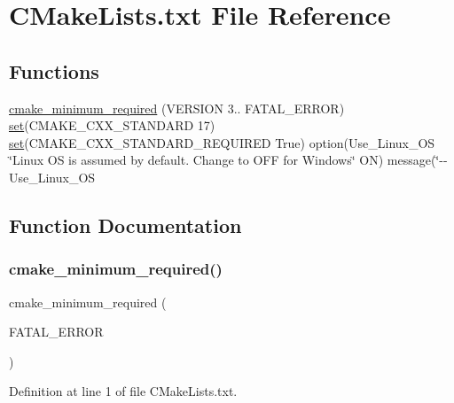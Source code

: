 \hypertarget{CMakeLists_8txt}{}\section{C\+Make\+Lists.\+txt File Reference}
\label{CMakeLists_8txt}
\subsection*{Functions}
\begin{DoxyCompactItemize}
\item 
\hyperlink{CMakeLists_8txt_a9ee6bb2c9e9a9eaaa86d8ae860fe2978}{cmake\+\_\+minimum\+\_\+required} (V\+E\+R\+S\+I\+ON 3.. F\+A\+T\+A\+L\+\_\+\+E\+R\+R\+OR) \hyperlink{3rd__party_2OCC__dependency_2CMakeLists_8txt_a074553c33956a239810d7affac62c071}{set}(C\+M\+A\+K\+E\+\_\+\+C\+X\+X\+\_\+\+S\+T\+A\+N\+D\+A\+RD 17) \hyperlink{3rd__party_2OCC__dependency_2CMakeLists_8txt_a074553c33956a239810d7affac62c071}{set}(C\+M\+A\+K\+E\+\_\+\+C\+X\+X\+\_\+\+S\+T\+A\+N\+D\+A\+R\+D\+\_\+\+R\+E\+Q\+U\+I\+R\+ED True) option(Use\+\_\+\+Linux\+\_\+\+OS \char`\"{}Linux OS is assumed by default. Change to O\+FF for Windows\char`\"{} ON) message(\char`\"{}-\/-\/ Use\+\_\+\+Linux\+\_\+\+OS
\end{DoxyCompactItemize}


\subsection{Function Documentation}
\mbox{\label{CMakeLists_8txt_a9ee6bb2c9e9a9eaaa86d8ae860fe2978}} 
\subsubsection{\texorpdfstring{cmake\+\_\+minimum\+\_\+required()}{cmake\_minimum\_required()}}
{\footnotesize\ttfamily cmake\+\_\+minimum\+\_\+required (\begin{DoxyParamCaption}\item[{V\+E\+R\+S\+I\+ON 3.\+14.\+4}]{F\+A\+T\+A\+L\+\_\+\+E\+R\+R\+OR }\end{DoxyParamCaption})}



Definition at line 1 of file C\+Make\+Lists.\+txt.


